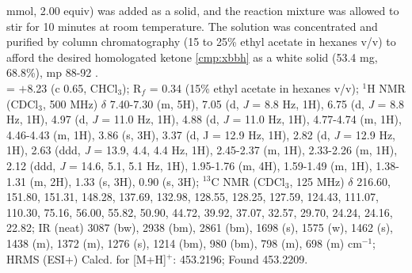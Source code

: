 mmol, 2.00 equiv) was added as a solid, and the reaction mixture was allowed to stir for 10 minutes at room temperature. The solution
was concentrated and purified by column chromatography (15 to 25\% ethyl acetate in hexanes v/v) to
afford the desired homologated ketone \ref{cmp:xbbh} as a white solid (53.4 mg, 68.8\%), mp 88-92
\degc. \\
\rotation = $+$8.23 (c 0.65, CHCl$_3$); R$_f$ = 0.34 (15\% ethyl acetate in hexanes v/v); $^1$H NMR (CDCl$_3$, 500
MHz) $\delta$ 7.40-7.30 (m, 5H), 7.05 (d, \textit{J} = 8.8 Hz, 1H), 6.75 (d, \textit{J} = 8.8 Hz, 1H), 4.97 (d, \textit{J} = 11.0
Hz, 1H), 4.88 (d, \textit{J} = 11.0 Hz, 1H), 4.77-4.74 (m, 1H), 4.46-4.43 (m, 1H), 3.86 (s, 3H), 3.37 (d, J
= 12.9 Hz, 1H), 2.82 (d, \textit{J} = 12.9 Hz, 1H), 2.63 (ddd, \textit{J} = 13.9, 4.4, 4.4 Hz, 1H), 2.45-2.37 (m,
1H), 2.33-2.26 (m, 1H), 2.12 (ddd, \textit{J} = 14.6, 5.1, 5.1 Hz, 1H), 1.95-1.76 (m, 4H), 1.59-1.49 (m,
1H), 1.38-1.31 (m, 2H), 1.33 (s, 3H), 0.90 (s, 3H); $^{13}$C NMR (CDCl$_3$, 125 MHz) $\delta$ 216.60, 151.80, 151.31, 148.28, 137.69, 132.98, 128.55, 128.25, 127.59, 124.43, 111.07, 110.30, 75.16,
56.00, 55.82, 50.90, 44.72, 39.92, 37.07, 32.57, 29.70, 24.24, 24.16, 22.82; IR (neat) 3087 (bw),
2938 (bm), 2861 (bm), 1698 (s), 1575 (w), 1462 (s), 1438 (m), 1372 (m), 1276 (s), 1214 (bm),
980 (bm), 798 (m), 698 (m) cm$^{-1}$; HRMS (ESI+) Calcd. for  [M+H]$^+$: 453.2196;
Found 453.2209.

